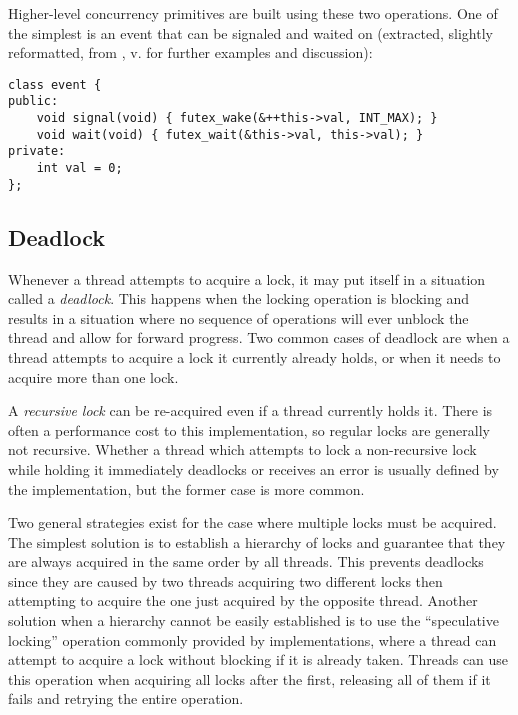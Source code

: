 Higher-level concurrency primitives are built using these two operations.  One
of the simplest is an event that can be signaled and waited on (extracted,
slightly reformatted, from \cite{Drepper2011}, v. for further examples and
discussion):

\begin{lstlisting}[style=c++]
class event {
public:
    void signal(void) { futex_wake(&++this->val, INT_MAX); }
    void wait(void) { futex_wait(&this->val, this->val); }
private:
    int val = 0;
};
\end{lstlisting}

\subsection{Deadlock}

Whenever a thread attempts to acquire a lock, it may put itself in a situation
called a \textit{deadlock}.  This happens when the locking operation is blocking
and results in a situation where no sequence of operations will ever unblock the
thread and allow for forward progress.  Two common cases of deadlock are when a
thread attempts to acquire a lock it currently already holds, or when it needs
to acquire more than one lock.

A \textit{recursive lock} can be re-acquired even if a thread currently holds
it.  There is often a performance cost to this implementation, so regular locks
are generally not recursive.  Whether a thread which attempts to lock a
non-recursive lock while holding it immediately deadlocks or receives an error
is usually defined by the implementation, but the former case is more common.

Two general strategies exist for the case where multiple locks must be acquired.
The simplest solution is to establish a hierarchy of locks and guarantee that
they are always acquired in the same order by all threads.  This prevents
deadlocks since they are caused by two threads acquiring two different locks
then attempting to acquire the one just acquired by the opposite thread.
Another solution when a hierarchy cannot be easily established is to use the
``speculative locking'' operation commonly provided by implementations, where a
thread can attempt to acquire a lock without blocking if it is already taken.
Threads can use this operation when acquiring all locks after the first,
releasing all of them if it fails and retrying the entire operation.
